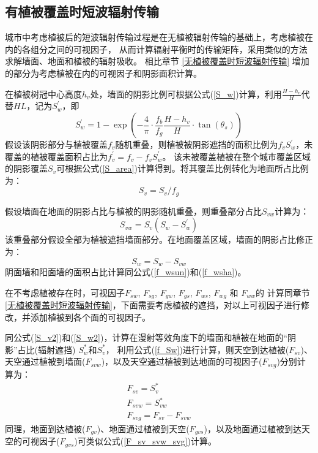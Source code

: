 \subsection{有植被覆盖时短波辐射传输}\label{有植被覆盖时短波辐射传输}
城市中考虑植被后的短波辐射传输过程是在无植被辐射传输的基础上，考虑植被在内的各组分之间的可视因子，
从而计算辐射平衡时的传输矩阵，采用类似的方法求解墙面、地面和植被的辐射吸收。
相比章节 \ref{无植被覆盖时短波辐射传输} 增加的部分为考虑植被在内的可视因子和阴影面积计算。

在植被树冠中心高度$h_v$处，墙面的阴影比例可根据公式(\ref{S_w})计算，利用$\frac{H-h_v}{H}$代替$HL$，记为$S_w^\prime$，即
\begin{equation}
S_{w}^{\prime}=1-\exp \left(-\frac{4}{\pi} \cdot \frac{f_{b}}{f_{g}} \frac{H-h_{v}}{H} \cdot \tan \left(\theta_{s}\right)\right)
\end{equation}
假设该阴影部分与植被覆盖$f_v$随机重叠，则植被被阴影遮挡的面积比例为$f_vS_w^\prime$，未覆盖的植被覆盖面积占比为$f_v^\prime=f_v-f_vS_w^\prime$。
该未被覆盖植被在整个城市覆盖区域的阴影覆盖$S_v$可根据公式(\ref{S_area})计算得到。将其覆盖比例转化为地面所占比例为：
\begin{equation}\label{S_v2}
S_{v}=S_{v} / f_{g}
\end{equation}

假设墙面在地面的阴影占比与植被的阴影随机重叠，则重叠部分占比$S_{vw}$计算为：
\begin{equation}
S_{v w}=S_{v}\left(S_{w}-S_{w}^{\prime}\right)
\end{equation}
该重叠部分假设全部为植被遮挡墙面部分。在地面覆盖区域，墙面的阴影占比修正为：
\begin{equation}\label{S_w2}
S_{w}=S_{w}-S_{v w}
\end{equation}
阴面墙和阳面墙的面积占比计算同公式(\ref{f_wsun})和(\ref{f_wsha})。

在不考虑植被存在时，可视因子$F_{sw}$, $F_{sg}$, $F_{gw}$, $F_{gs}$, $F_{ws}$, $F_{wg}$ 和 $F_{ww}$的
计算同章节 \ref{无植被覆盖时短波辐射传输}，下面需要考虑植被的遮挡，对以上可视因子进行修改，并添加植被到各个面的可视因子。

同公式(\ref{S_v2})和(\ref{S_w2})，计算在漫射等效角度下的墙面和植被在地面的“阴影”占比(辐射遮挡) $S_w^\ast$和$S_v^\ast$，
利用公式(\ref{f_Sw})进行计算，则天空到达植被($F_{sv}$)、天空通过植被到墙面($F_{svw}$)，以及天空通过植被到达地面的可视因子($F_{svg}$)分别计算为：
\begin{equation}\label{F_sv_svw_svg}
\begin{array}{c}F_{s v}=S_{v}^{*} \\ F_{s v w}=S_{v w}^{*} \\ F_{s v g}=F_{s v}-F_{s v w}\end{array}
\end{equation}
同理，地面到达植被($F_{gv}$)、地面通过植被到天空($F_{gvs}$)，以及地面通过植被到达天空的可视因子($F_{gvs}$)可类似公式(\ref{F_sv_svw_svg})计算。

